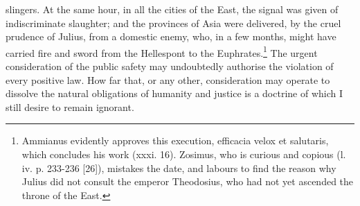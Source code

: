 slingers. At the same hour, in all the cities of the East, the signal was given of indiscriminate slaughter; and the provinces of Asia were delivered, by the cruel prudence of Julius, from a domestic enemy, who, in a few months, might have carried fire and sword from the Hellespont to the Euphrates.\footnote{Ammianus evidently approves this execution, efficacia velox et salutaris, which concludes his work (xxxi. 16). Zosimus, who is curious and copious (l. iv. p. 233-236 [26]), mistakes the date, and labours to find the reason why Julius did not consult the emperor Theodosius, who had not yet ascended the throne of the East.} The urgent consideration of the public safety may undoubtedly authorise the violation of every positive law. How far that, or any other, consideration may operate to dissolve the natural obligations of humanity and justice is a doctrine of which I still desire to remain ignorant.

